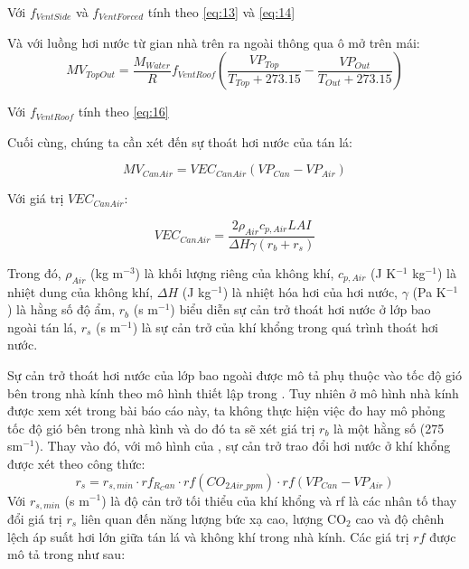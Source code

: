 \documentclass[a4paper]{article}
\begin{document}
Với $f_{VentSide}$ và $f_{VentForced}$ tính theo \eqref{eq:13} và \eqref{eq:14}

Và với luồng hơi nước từ gian nhà trên ra ngoài thông qua ô mở trên mái:
\begin{equation}\label{TopOut}
MV_{TopOut} = \frac{M_{Water}}{R}f_{VentRoof}  \left( \frac{VP_{Top}}{T_{Top} +273.15}-\frac{VP_{Out}}{T_{Out} +273.15} \right)
\end{equation}

Với $f_{VentRoof}$  tính theo \eqref{eq:16}

Cuối cùng, chúng ta cần xét đến sự thoát hơi nước của tán lá:

\begin{equation}\label{CanAir}
MV_{CanAir}= VEC_{CanAir}(VP_{Can}-VP_{Air})
\end{equation}

Với giá trị $VEC_{CanAir}$:

\begin{equation}\label{VECCanAir}
VEC_{CanAir} =  \frac{2\rho_{Air}c_{p,Air}LAI}{\Delta H\gamma(r_b+r_s)}
\end{equation}

Trong đó, $\rho_{Air}$ (kg m$^{-3}$) là khối lượng riêng của không khí, $c_{p,Air}$ (J K$^{-1}$ kg$^{-1}$) là nhiệt dung của không khí, $\Delta H$ (J kg$^{-1}$) là nhiệt hóa hơi của hơi nước,  $\gamma$ (Pa K$^{-1}$) là hằng số độ ẩm, $r_b$ (s m$^{-1}$) biểu diễn sự cản trở thoát hơi nước ở lớp bao ngoài tán lá, $r_s$ (s m$^{-1}$) là sự cản trở của khí khổng trong quá trình thoát hơi nước.

Sự cản trở thoát hơi nước của lớp bao ngoài được mô tả phụ thuộc vào tốc độ gió bên trong nhà kính theo mô hình thiết lập trong \cite{stanghellini1987model}. Tuy nhiên ở mô hình nhà kính được xem xét trong bài báo cáo này, ta không thực hiện việc đo hay mô phỏng tốc độ gió bên trong nhà kình và do đó ta sẽ xét giá trị $r_b$ là một hằng số (275 sm$^{-1}$). Thay vào đó, với mô hình của \cite{stanghellini1987model}, sự cản trở trao đổi hơi nước ở khí khổng được xét theo công thức:
\begin{equation}
    r_s = r_{s,min} \cdot rf_{R_Can} \cdot rf(CO_{2 Air\_ppm}) \cdot rf(VP_{Can} - VP_{Air})
\end{equation}
Với $r_{s,min}$ (s m$^{-1}$) là độ cản trở tối thiểu của khí khổng và rf là các nhân tố thay đổi giá trị $r_s$  liên quan đến năng lượng bức xạ cao, lượng $\mathrm{CO_2}$ cao và độ chênh lệch áp suất hơi lớn giữa tán lá và không khí trong nhà kính. Các giá trị $rf$ được mô tả trong \cite{stanghellini1987model} như sau:
\end{document}
